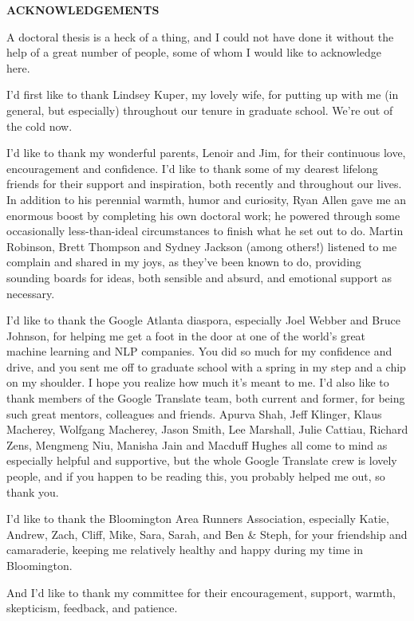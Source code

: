 
\begin{centering}
\textbf{ACKNOWLEDGEMENTS}\\
\vspace{\baselineskip}
\end{centering}

A doctoral thesis is a heck of a thing, and I could not have done it without
the help of a great number of people, some of whom I would like to acknowledge
here.

I'd first like to thank Lindsey Kuper, my lovely wife, for putting up with me
(in general, but especially) throughout our tenure in graduate school. We're
out of the cold now.

I'd like to thank my wonderful parents, Lenoir and Jim, for their continuous
love, encouragement and confidence.
I'd like to thank some of my dearest lifelong friends for their support and
inspiration, both recently and throughout our lives.
In addition to his perennial warmth, humor and curiosity, Ryan Allen gave me an
enormous boost by completing his own doctoral work\cite{allen2017visions}; he
powered through some occasionally less-than-ideal circumstances to finish what
he set out to do. Martin Robinson, Brett Thompson and Sydney Jackson (among
others!) listened to me complain and shared in my joys, as they've been known
to do, providing sounding boards for ideas, both sensible and absurd, and
emotional support as necessary.

I'd like to thank the Google Atlanta diaspora, especially Joel Webber and Bruce
Johnson, for helping me get a foot in the door at one of the world's great
machine learning and NLP companies. You did so much for my confidence and
drive, and you sent me off to graduate school with a spring in my step and a
chip on my shoulder. I hope you realize how much it's meant to me. I'd also
like to thank members of the Google Translate team, both current and former,
for being such great mentors, colleagues and friends. Apurva Shah, Jeff
Klinger, Klaus Macherey, Wolfgang Macherey, Jason Smith, Lee Marshall, Julie
Cattiau, Richard Zens, Mengmeng Niu, Manisha Jain and Macduff Hughes all come
to mind as especially helpful and supportive, but the whole Google Translate
crew is lovely people, and if you happen to be reading this, you probably
helped me out, so thank you.

I'd like to thank the Bloomington Area Runners Association, especially Katie,
Andrew, Zach, Cliff, Mike, Sara, Sarah, and Ben \& Steph, for your friendship
and camaraderie, keeping me relatively healthy and happy during my time in
Bloomington.

And I'd like to thank my committee for their encouragement, support, warmth,
skepticism, feedback, and patience.
